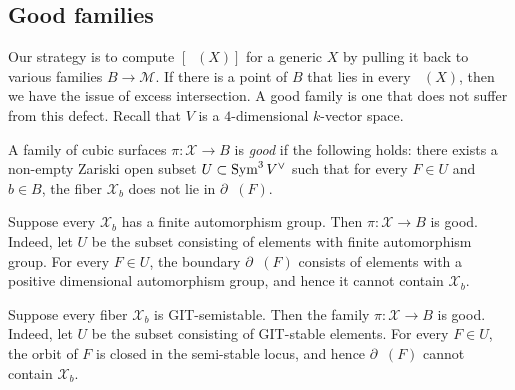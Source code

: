 \documentclass[12pt,reqno]{amsart}
\renewcommand{\k}{k}
\DeclareMathOperator{\Orb}{\overline{Orb}}
\renewcommand{\to}{{\longrightarrow}}
\numberwithin{equation}{section}
\newcommand{\cX}{\mathcal{X}}
\begin{document}
\subsection{Good families}
\label{sec:good-families}
Our strategy is to compute $[\Orb(X)]$ for a generic $X$ by pulling it back to various families $B \to \mathscr M$.
If there is a point of $B$ that lies in every $\Orb(X)$, then we have the issue of excess intersection. 
A good family is one that does not suffer from this defect.
Recall that $V$ is a $4$-dimensional $\k$-vector space.
\begin{definition}
\label{def:goodfamily}
A family of cubic surfaces $\pi \colon \cX \to B$ is \emph{good} if
the following holds: there exists a non-empty Zariski open subset
$U \subset \operatorname{Sym}^3V^\vee$ such that for every $F \in U$ and $b \in B$,
the fiber $\cX_b$ does not lie in $\partial \Orb(F)$.
\end{definition}
\begin{example}
  Suppose every $\cX_b$ has a finite automorphism group.  Then
  $\pi \colon \cX \to B$ is good.  Indeed, let $U$ be the subset
  consisting of elements with finite automorphism group.  For every
  $F \in U$, the boundary $\partial \Orb(F)$ consists of elements with
  a positive dimensional automorphism group, and hence it cannot
  contain $\cX_b$.
\end{example}
\begin{example}
  \label{ex:semistable}
  Suppose every fiber $\cX_b$ is GIT-semistable.
  Then the family $\pi \colon \cX \to B$ is good.
  Indeed, let $U$ be the subset consisting of GIT-stable elements.
  For every $F \in U$, the orbit of $F$ is closed in the semi-stable locus, and hence $\partial \Orb(F)$ cannot contain $\cX_b$.
\end{example}
\end{document}
